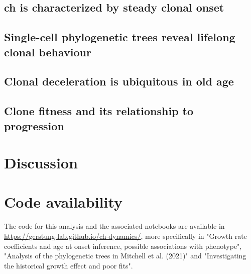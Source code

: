\begin{figure}[!ht]
	\label{fig:ch-variance-uc-technical}
\end{figure}

\begin{figure}[!ht]
	\label{fig:ch-variance-uc-biological}
\end{figure}

\subsection{\ac{ch} is characterized by steady clonal onset}

\subsection{Single-cell phylogenetic trees reveal lifelong clonal behaviour}

\subsection{Clonal deceleration is ubiquitous in old age}

\subsection{Clone fitness and its relationship to progression}

\FloatBarrier

\section{Discussion}



\section{Code availability}

The code for this analysis and the associated notebooks are available in \url{https://gerstung-lab.github.io/ch-dynamics/}, more specifically in "Growth rate coefficients and age at onset inference, possible associations with phenotype", "Analysis of the phylogenetic trees in Mitchell et al. (2021)" and "Investigating the historical growth effect and poor fits".